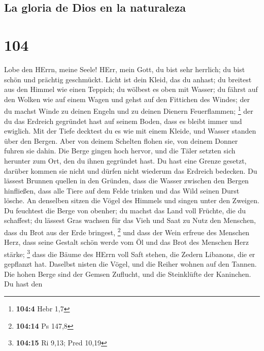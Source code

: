 \hypertarget{la-gloria-de-dios-en-la-naturaleza}{%
\subsection{La gloria de Dios en la
naturaleza}\label{la-gloria-de-dios-en-la-naturaleza}}

\hypertarget{section-103}{%
\section{104}\label{section-103}}

 Lobe den HErrn, meine Seele! HErr, mein Gott, du bist
sehr herrlich; du bist schön und prächtig geschmückt. 
Licht ist dein Kleid, das du anhast; du breitest aus den Himmel wie
einen Teppich;  du wölbest es oben mit Wasser; du fährst
auf den Wolken wie auf einem Wagen und gehst auf den Fittichen des
Windes;  der du machst Winde zu deinen Engeln und zu
deinen Dienern Feuerflammen; \footnote{\textbf{104:4} Hebr 1,7}
 der du das Erdreich gegründet hast auf seinem Boden, dass
es bleibt immer und ewiglich.  Mit der Tiefe decktest du
es wie mit einem Kleide, und Wasser standen über den Bergen.
 Aber von deinem Schelten flohen sie, von deinem Donner
fuhren sie dahin.  Die Berge gingen hoch hervor, und die
Täler setzten sich herunter zum Ort, den du ihnen gegründet hast.
 Du hast eine Grenze gesetzt, darüber kommen sie nicht und
dürfen nicht wiederum das Erdreich bedecken.  Du lässest
Brunnen quellen in den Gründen, dass die Wasser zwischen den Bergen
hinfließen,  dass alle Tiere auf dem Felde trinken und
das Wild seinen Durst lösche.  An denselben sitzen die
Vögel des Himmels und singen unter den Zweigen.  Du
feuchtest die Berge von obenher; du machst das Land voll Früchte, die du
schaffest;  du lässest Gras wachsen für das Vieh und Saat
zu Nutz den Menschen, dass du Brot aus der Erde bringest, \footnote{\textbf{104:14}
  Ps 147,8}  und dass der Wein erfreue des Menschen Herz,
dass seine Gestalt schön werde vom Öl und das Brot des Menschen Herz
stärke; \footnote{\textbf{104:15} Ri 9,13; Pred 10,19} 
dass die Bäume des HErrn voll Saft stehen, die Zedern Libanons, die er
gepflanzt hat.  Daselbst nisten die Vögel, und die Reiher
wohnen auf den Tannen.  Die hohen Berge sind der Gemsen
Zuflucht, und die Steinklüfte der Kaninchen.  Du hast den

